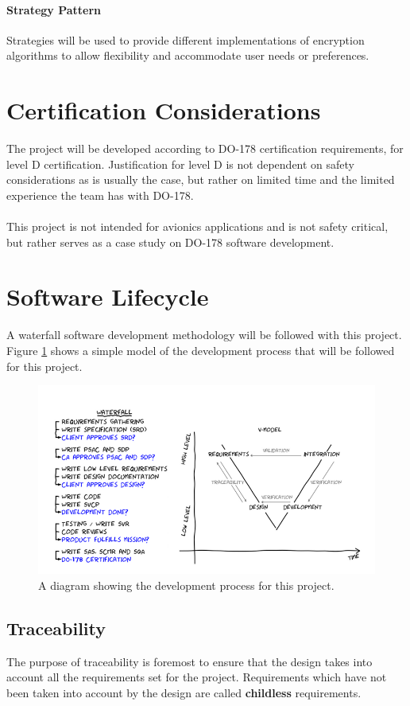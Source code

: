 \documentclass[11pt]{article}
\begin{document}
\paragraph{Strategy Pattern}
Strategies will be used to provide different implementations of encryption algorithms to allow flexibility and accommodate user needs or preferences.

\section{Certification Considerations}
The project will be developed according to DO-178 certification requirements, for level D certification. Justification for level D is not dependent on safety considerations as is usually the case, but rather on limited time and the limited experience the team has with DO-178. \\ \\
This project is not intended for avionics applications and is not safety critical, but rather serves as a case study on DO-178 software development.

\section{Software Lifecycle}\label{sec:soft-life}
A waterfall software development methodology will be followed with this project. Figure \ref{figure-waterfall} shows a simple model of the development process that will be followed for this project.

\begin{figure}[H]
\centering
\includegraphics[width=4.5in]{./images/waterfall_model.png}
\caption[Waterfall Model]{A diagram showing the development process for this project.}
\label{figure-waterfall}
\end{figure}

\subsection{Traceability}
The purpose of traceability is foremost to ensure that the design takes into account all the requirements set for the project. Requirements which have not been taken into account by the design are called \textbf{childless} requirements.\\
\end{document}
